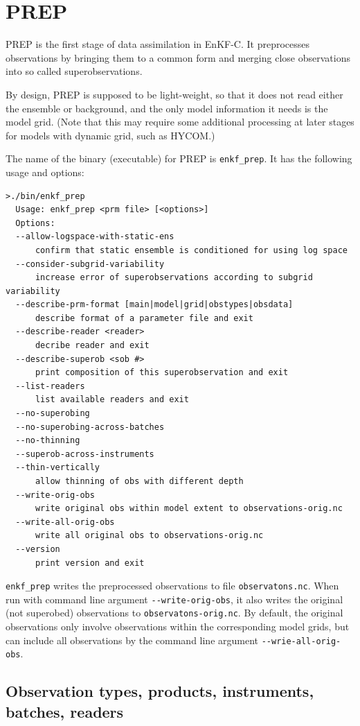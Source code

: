 \documentclass[11pt]{report}
\begin{document}
\section{PREP}

PREP is the first stage of data assimilation in EnKF-C.
It preprocesses observations by bringing them to a common form and merging close observations into so called superobservations.

By design, PREP is supposed to be light-weight, so that it does not read either the ensemble or background, and the only model information it needs is the model grid. 
(Note that this may require some additional processing at later stages for models with dynamic grid, such as HYCOM.)

The name of the binary (executable) for PREP is \verb|enkf_prep|.
It has the following usage and options:
\begin{Verbatim}[frame=single,fontsize=\footnotesize]
>./bin/enkf_prep
  Usage: enkf_prep <prm file> [<options>]
  Options:
  --allow-logspace-with-static-ens
      confirm that static ensemble is conditioned for using log space
  --consider-subgrid-variability
      increase error of superobservations according to subgrid variability
  --describe-prm-format [main|model|grid|obstypes|obsdata]
      describe format of a parameter file and exit
  --describe-reader <reader>
      decribe reader and exit
  --describe-superob <sob #>
      print composition of this superobservation and exit
  --list-readers
      list available readers and exit
  --no-superobing
  --no-superobing-across-batches
  --no-thinning
  --superob-across-instruments
  --thin-vertically
      allow thinning of obs with different depth
  --write-orig-obs
      write original obs within model extent to observations-orig.nc
  --write-all-orig-obs
      write all original obs to observations-orig.nc
  --version
      print version and exit
\end{Verbatim}

\verb|enkf_prep| writes the preprocessed observations to file \verb|observatons.nc|.
When run with command line argument \verb|--write-orig-obs|, it also writes the original (not superobed) observations to \verb|observatons-orig.nc|.
By default, the original observations only involve observations within the corresponding model grids, but can include all observations by the command line argument \verb|--wrie-all-orig-obs|.

\subsection{Observation types, products, instruments, batches, readers}
\end{document}
